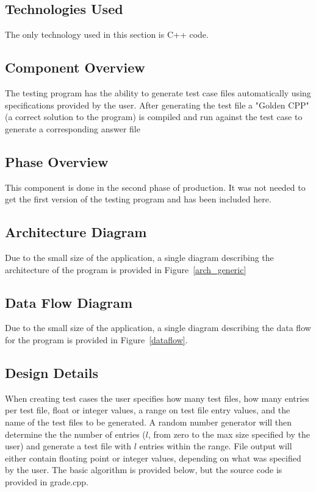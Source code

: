 \subsection{Technologies  Used}
The only technology used in this section is C++ code.

\subsection{Component  Overview}
The testing program has the ability to generate test case files
automatically using specifications provided by the user. After 
generating the test file a "Golden CPP" (a correct solution to
the program) is compiled and run against the test case to generate
a corresponding answer file

\subsection{Phase Overview}
This component is done in the second phase of production. It was not
needed to get the first version of the testing program and has been
included here.

\subsection{ Architecture  Diagram}
Due to the small size of the application, a single diagram describing the architecture of the program is provided in Figure~\ref{arch_generic}


\subsection{Data Flow Diagram}
Due to the small size of the application, a single diagram describing the data flow for the program is provided in Figure~\ref{dataflow}.

\subsection{Design Details}
When creating test cases the user specifies how many test files, how many entries per test file, float or integer values, a range on test file entry values, and the name of the test files to be generated. A random number generator will then determine the the number of entries ($l$, from zero to the max size specified by the user) and generate a test file with $l$ entries within the range. File output will either contain floating point or integer values, depending on what was specified by the user. The basic algorithm is provided below, but the source code is provided in grade.cpp.

